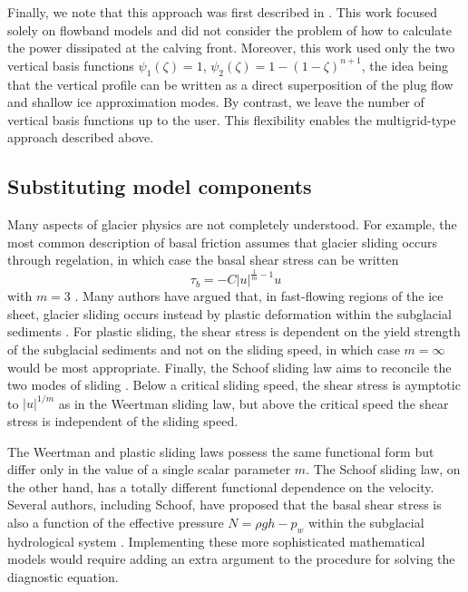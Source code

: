 \documentclass{article}
\theoremstyle{definition}
\theoremstyle{plain}
\begin{document}
Finally, we note that this approach was first described in \citet{bassis2010hamilton}.
This work focused solely on flowband models and did not consider the problem of how to calculate the power dissipated at the calving front.
Moreover, this work used only the two vertical basis functions $\psi_1(\zeta) = 1$, $\psi_2(\zeta) = 1 - (1 - \zeta)^{n + 1}$, the idea being that the vertical profile can be written as a direct superposition of the plug flow and shallow ice approximation modes.
By contrast, we leave the number of vertical basis functions up to the user.
This flexibility enables the multigrid-type approach described above.


\subsection{Substituting model components}

Many aspects of glacier physics are not completely understood.
For example, the most common description of basal friction assumes that glacier sliding occurs through regelation, in which case the basal shear stress can be written
\begin{equation}
    \tau_b = -C|u|^{\frac{1}{m} - 1}u
\end{equation}
with $m = 3$ \citep{weertman1957sliding}.
Many authors have argued that, in fast-flowing regions of the ice sheet, glacier sliding occurs instead by plastic deformation within the subglacial sediments \citep{tulaczyk2000basal}.
For plastic sliding, the shear stress is dependent on the yield strength of the subglacial sediments and not on the sliding speed, in which case $m = \infty$ would be most appropriate.
Finally, the Schoof sliding law aims to reconcile the two modes of sliding \citep{schoof2005effect}.
Below a critical sliding speed, the shear stress is aymptotic to $|u|^{1/m}$ as in the Weertman sliding law, but above the critical speed the shear stress is independent of the sliding speed.

The Weertman and plastic sliding laws possess the same functional form but differ only in the value of a single scalar parameter $m$.
The Schoof sliding law, on the other hand, has a totally different functional dependence on the velocity.
Several authors, including Schoof, have proposed that the basal shear stress is also a function of the effective pressure $N = \rho gh - p_w$ within the subglacial hydrological system \citep{budd1979empirical, schoof2005effect}.
Implementing these more sophisticated mathematical models would require adding an extra argument to the procedure for solving the diagnostic equation.
\end{document}
